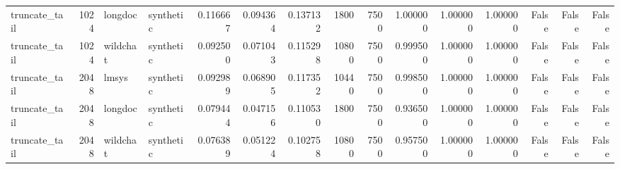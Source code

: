 \begin{tabular}{lrllrrrrrrrrrrr}
truncate_tail & 1024 & longdoc & synthetic & 0.116667 & 0.094364 & 0.137132 & 1800 & 7500 & 1.000000 & 1.000000 & 1.000000 & False & False & False \\
truncate_tail & 1024 & wildchat & synthetic & 0.092500 & 0.071043 & 0.115298 & 10800 & 7500 & 0.999500 & 1.000000 & 1.000000 & False & False & False \\
truncate_tail & 2048 & lmsys & synthetic & 0.092989 & 0.068905 & 0.117352 & 10440 & 7500 & 0.998500 & 1.000000 & 1.000000 & False & False & False \\
truncate_tail & 2048 & longdoc & synthetic & 0.079444 & 0.047156 & 0.110530 & 1800 & 7500 & 0.936500 & 1.000000 & 1.000000 & False & False & False \\
truncate_tail & 2048 & wildchat & synthetic & 0.076389 & 0.051224 & 0.102758 & 10800 & 7500 & 0.957500 & 1.000000 & 1.000000 & False & False & False \\
\bottomrule
\end{tabular}
